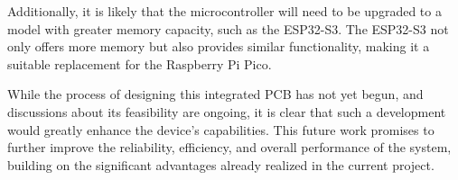 Additionally, it is likely that the microcontroller will need to be upgraded to a model with 
greater memory capacity, such as the ESP32-S3. The ESP32-S3 not only offers more memory but also 
provides similar functionality, making it a suitable replacement for the Raspberry Pi Pico.

While the process of designing this integrated PCB has not yet begun, and discussions about its 
feasibility are ongoing, it is clear that such a development would greatly enhance the device's 
capabilities. This future work promises to further improve the reliability, efficiency, and 
overall performance of the system, building on the significant advantages already realized in the 
current project.
